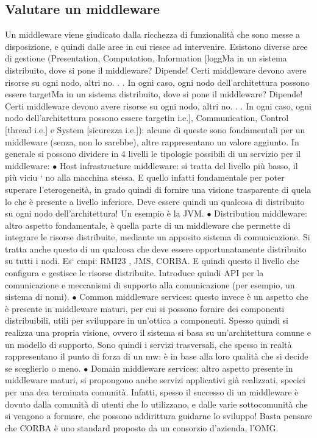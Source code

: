 \subsection{Valutare un middleware}
Un middleware viene giudicato dalla ricchezza di funzionalità che sono messe a
disposizione, e quindi dalle aree in cui riesce ad intervenire. Esistono diverse
aree di gestione (Presentation, Computation, Information [loggMa in un sistema distribuito, dove si pone il middleware?
Dipende! Certi middleware
devono avere risorse su ogni nodo, altri no. . . In ogni caso, ogni nodo dell'architettura possono
essere targetMa in un sistema distribuito, dove si pone il middleware?
Dipende! Certi middleware
devono avere risorse su ogni nodo, altri no. . . In ogni caso, ogni nodo dell'architettura possono
essere targetin i.e.], Communication, Control [thread i.e.] e System
[sicurezza i.e.]): alcune di queste sono
fondamentali per un middleware (senza, non lo sarebbe), altre rappresentano
un valore aggiunto.
In generale si possono dividere in 4 livelli le tipologie possibili di un servizio
per il middleware:
$\bullet$ Host infrastructure middleware: si tratta del livello più basso, il più viciu
`
no alla macchina stessa. E quello infatti fondamentale per poter superare
l'eterogeneità, in grado quindi di fornire una visione trasparente di quela
lo che è presente a livello inferiore. Deve essere quindi un qualcosa di
distribuito su ogni nodo dell'architettura! Un esempio è la JVM.
$\bullet$ Distribution middleware: altro aspetto fondamentale, è quella parte di un
middleware che permette di integrare le risorse distribuite, mediante un
apposito sistema di comunicazione. Si tratta anche questo di un qualcosa che deve essere opportunatamente distribuito su
tutti i nodi. Es`
empi: RMI23 , JMS, CORBA. E quindi questo il livello che configura e
gestisce le risorse distribuite. Introduce quindi API per la comunicazione
e meccanismi di supporto alla comunicazione (per esempio, un sistema di
nomi).
$\bullet$ Common middleware services: questo invece è un aspetto che è presente in
middleware maturi, per cui si possono fornire dei componenti distribuibili,
utili per sviluppare in un'ottica a componenti. Spesso quindi si realizza
una propria visione, ovvero il sistema si basa su un'architettura comune
e un modello di supporto. Sono quindi i servizi trasversali, che spesso in
realtà rappresentano il punto di forza di un mw: è in base alla loro qualità
che si decide se sceglierlo o meno.
$\bullet$ Domain middleware services: altro aspetto presente in middleware maturi,
si propongono anche servizi applicativi già realizzati, specici per una dea
terminata comunità. Infatti, spesso il successo di un middleware è dovuto
dalla comunità di utenti che lo utilizzano, e dalle varie sottocomunità che
si vengono a formare, che possono addirittura guidarne lo sviluppo! Basta
pensare che CORBA è uno standard proposto da un consorzio d'azienda,
l'OMG.
